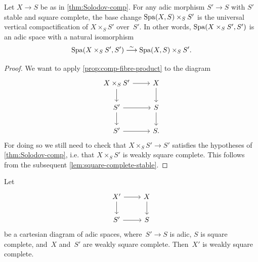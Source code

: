 \begin{cor} \label{cor:functoriality-compactification}
    Let $X \to S$ be as in \cref{thm:Solodov-comp}.
    For any adic morphism $S' \to S$ with $S'$ stable and square complete, the base change $\operatorname{Spa}(X,S)\times_S S'$ is the universal vertical compactification of $X \times_S S'$ over~$S'$.
    In other words, $\operatorname{Spa}(X\times_S S',S')$ is an adic space with a natural isomorphism
    \[
     \operatorname{Spa}(X \times_S S',S') \overset{\sim}{\longrightarrow} \operatorname{Spa}(X,S)\times_S S'.
    \]
\end{cor}


\begin{proof}
We want to apply \cref{prop:comp-fibre-product} to the diagram
\[
    \begin{tikzcd}
        X \times_S S'\ar[r] \ar[d] & X\ar[d] \\
        S'\ar[r] \ar[d] & S \ar[d] \\
        S'\ar[r] & S.
    \end{tikzcd}
\]
For doing so we still need to check that $X \times_S S' \to S'$ satisfies the hypotheses of \cref{thm:Solodov-comp}, i.e. that $X \times_S S'$ is weakly square complete.
This follows from the subsequent \cref{lem:square-complete-stable}.
\end{proof}

\begin{lem} \label{lem:square-complete-stable}
    Let
    \[
        \begin{tikzcd}
            X'  \ar[r]  \ar[d]  & X \ar[d]  \\
            S'  \ar[r]          & S
        \end{tikzcd}
    \]
    be a cartesian diagram of adic spaces, where~$S' \to S$ is adic, $S$ is square complete, and~$X$ and~$S'$ are weakly square complete.
    Then~$X'$ is weakly square complete.
\end{lem}

